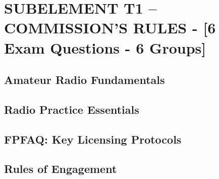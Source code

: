 \documentclass[12pt]{book}
\begin{document}
\tableofcontents
\newpage
\chapter{SUBELEMENT T1 – COMMISSION’S RULES - [6 Exam Questions - 6 Groups]}
\section{Amateur Radio Fundamentals}











\section{Radio Practice Essentials}












\section{FPFAQ: Key Licensing Protocols}











\section{Rules of Engagement}











\end{document}
